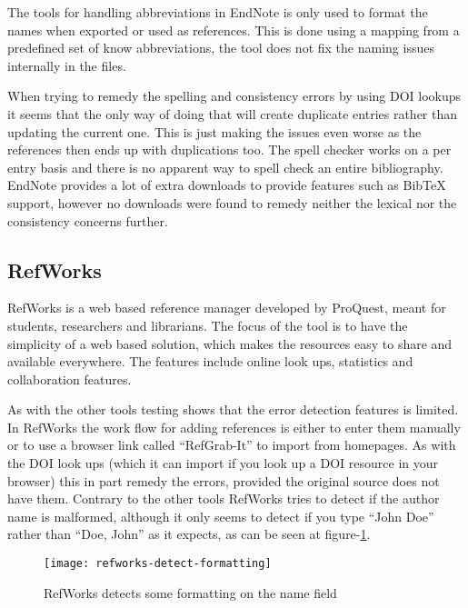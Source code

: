 The tools for handling abbreviations in EndNote is only used to format
the names when exported or used as references.  This is done using a
mapping from a predefined set of know abbreviations, the tool does not
fix the naming issues internally in the
files\cite{endnote_terms_journals}.

When trying to remedy the spelling and consistency errors by using DOI
lookups it seems that the only way of doing that will create duplicate
entries rather than updating the current one. This is just making the
issues even worse as the references then ends up with duplications
too.  The spell checker works on a per entry basis and there is no
apparent way to spell check an entire bibliography.  EndNote provides
a lot of extra downloads to provide features such as Bib{\TeX}
support, however no downloads were found to remedy neither the lexical
nor the consistency concerns further\cite{endnote_downloads}.

\subsection{RefWorks}
RefWorks is a web based reference manager developed by ProQuest, meant
for students, researchers and librarians.  The focus of the tool is to
have the simplicity of a web based solution, which makes the resources
easy to share and available everywhere.  The features include online
look ups, statistics and collaboration
features\cite{refworks_features}.

As with the other tools testing shows that the error detection
features is limited.  In RefWorks the work flow for adding references
is either to enter them manually or to use a browser link called
``RefGrab-It'' to import from homepages.  As with the DOI look ups
(which it can import if you look up a DOI resource in your browser)
this in part remedy the errors, provided the original source does not
have them.  Contrary to the other tools RefWorks tries to detect if
the author name is malformed, although it only seems to detect if you
type ``John Doe'' rather than ``Doe, John'' as it expects, as can be
seen at figure-\ref{fig:refworks-detect-formatting}.

\begin{figure}[ht]
    \centering
    \texttt{[image: refworks-detect-formatting]}
    \caption{RefWorks detects some formatting on the name field}
    \label{fig:refworks-detect-formatting}
\end{figure}

